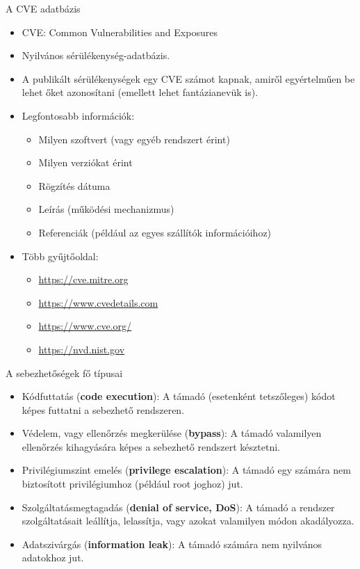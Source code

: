 \documentclass[12 pt]{beamer}
\begin{document}
\begin{frame}{A CVE adatbázis}
  \begin{itemize}
    \item{CVE: Common Vulnerabilities and Exposures}
    \item{Nyilvános sérülékenység-adatbázis.}
    \item{A publikált sérülékenységek egy CVE számot kapnak, amiről egyértelműen be lehet őket azonosítani (emellett lehet fantázianevük is).}
    \item{Legfontosabb információk:}
      \begin{itemize}
        \item{Milyen szoftvert (vagy egyéb rendszert érint)}
        \item{Milyen verziókat érint}
        \item{Rögzítés dátuma}
        \item{Leírás (működési mechanizmus)}
        \item{Referenciák (például az egyes szállítók információihoz)}
      \end{itemize}
        \item{Több gyűjtőoldal:}
          \begin{itemize}
            \item{\href{https://cve.mitre.org}{https://cve.mitre.org}}
            \item{\href{https://www.cvedetails.com}{https://www.cvedetails.com}}
            \item{\href{https://www.cve.org/}{https://www.cve.org/}}
            \item{\href{https://nvd.nist.gov}{https://nvd.nist.gov}}
          \end{itemize}
  \end{itemize}
\end{frame}

\begin{frame}{A sebezhetőségek fő típusai}
  \begin{itemize}
    \item{Kódfuttatás (\textbf{code execution}): A támadó (esetenként tetszőleges) kódot képes futtatni a sebezhető rendszeren.}
    \item{Védelem, vagy ellenőrzés megkerülése (\textbf{bypass}): A támadó valamilyen ellenőrzés kihagyására képes a sebezhető rendszert késztetni.}
    \item{Privilégiumszint emelés (\textbf{privilege escalation}): A támadó egy számára nem biztosított privilégiumhoz (például root joghoz) jut.}
    \item{Szolgáltatásmegtagadás (\textbf{denial of service, DoS}): A támadó a rendszer szolgáltatásait leállítja, lelassítja, vagy azokat valamilyen módon akadályozza.}
    \item{Adatszivárgás (\textbf{information leak}): A támadó számára nem nyilvános adatokhoz jut.}
  \end{itemize}
\end{frame}
\end{document}
